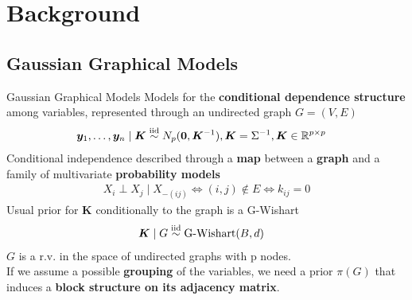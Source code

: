 

\section{Background}

\subsection{Gaussian Graphical Models}
\begin{frame}{Gaussian Graphical Models}
    Models for the \textbf{conditional dependence structure} among variables, represented through an undirected graph $G=(V,E)$
    \begin{align*}
    \bm{y}_{1}, \ldots, \bm{y}_{n} \mid \bm{K} &\iid N_{p}(\bm{0},\bm{K}^{-1}), \bm{K}=\Sigma^{-1}, \bm{K} \in \mathbb{R}^{p\times p}  %
    \end{align*}
Conditional independence described through a \textbf{map} between a \textbf{graph} and a family of multivariate \textbf{probability models}
\begin{align*}
X_{i}\perp X_{j} \mid X_{-(ij)} \iff (i,j) \notin E \iff k_{ij}=0
\end{align*}
Usual prior for $\bm{K}$ conditionally to the graph is a G-Wishart
\begin{align*}
    \bm{K} \mid G &\overset{\mathrm{iid}}{\sim} \text{G-Wishart}(B,d)
\end{align*}
$G$ is a r.v. in the space of undirected graphs with p nodes.\\
If we assume a possible \textbf{grouping} of the variables, we need a prior $\pi(G)$ that induces a \textbf{block structure on its adjacency matrix}.
\end{frame}





 



